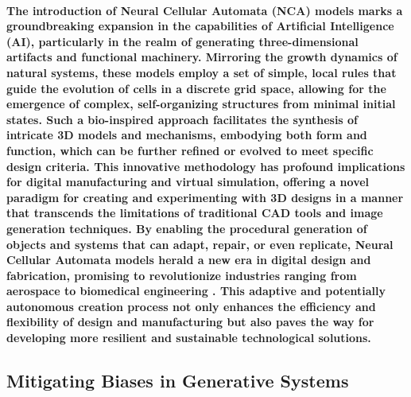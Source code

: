 \documentclass[11pt,a4paper,oneside]{report}
\begin{document}
\paragraph{The introduction of Neural Cellular Automata (NCA) models marks a groundbreaking expansion in the capabilities of Artificial Intelligence (AI), particularly in the realm of generating three-dimensional artifacts and functional machinery. Mirroring the growth dynamics of natural systems, these models employ a set of simple, local rules that guide the evolution of cells in a discrete grid space, allowing for the emergence of complex, self-organizing structures from minimal initial states. Such a bio-inspired approach facilitates the synthesis of intricate 3D models and mechanisms, embodying both form and function, which can be further refined or evolved to meet specific design criteria. This innovative methodology has profound implications for digital manufacturing and virtual simulation, offering a novel paradigm for creating and experimenting with 3D designs in a manner that transcends the limitations of traditional CAD tools and image generation techniques. By enabling the procedural generation of objects and systems that can adapt, repair, or even replicate, Neural Cellular Automata models herald a new era in digital design and fabrication, promising to revolutionize industries ranging from aerospace to biomedical engineering \cite{sudhakaran2021growing}. This adaptive and potentially autonomous creation process not only enhances the efficiency and flexibility of design and manufacturing but also paves the way for developing more resilient and sustainable technological solutions.}

\subsection{Mitigating Biases in Generative Systems}
\end{document}
